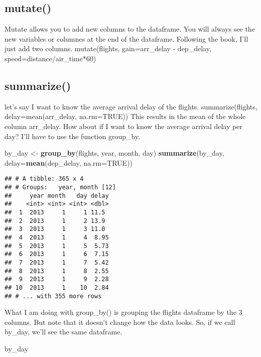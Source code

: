 \documentclass[
]{article}
\newenvironment{Shaded}{\begin{snugshade}}{\end{snugshade}}
\newcommand{\DataTypeTok}[1]{\textcolor[rgb]{0.13,0.29,0.53}{#1}}
\newcommand{\KeywordTok}[1]{\textcolor[rgb]{0.13,0.29,0.53}{\textbf{#1}}}
\newcommand{\NormalTok}[1]{#1}
\newcommand{\OtherTok}[1]{\textcolor[rgb]{0.56,0.35,0.01}{#1}}
\newcommand{\StringTok}[1]{\textcolor[rgb]{0.31,0.60,0.02}{#1}}
\begin{document}
\hypertarget{mutate}{%
\subsection{mutate()}\label{mutate}}

Mutate allows you to add new columns to the dataframe. You will always
see the new variables or columnes at the end of the dataframe. Following
the book, I'll just add two columns. mutate(flights, gain=arr\_delay -
dep\_delay, speed=distance/air\_time*60)

\hypertarget{summarize}{%
\subsection{summarize()}\label{summarize}}

let's say I want to know the average arrival delay of the flights.
summarize(flights, delay=mean(arr\_delay, na.rm=TRUE)) This results in
the mean of the whole column arr\_delay. How about if I want to know the
average arrival delay per day? I'll have to use the function group\_by.

\begin{Shaded}
\begin{Highlighting}[]
\NormalTok{by_day <-}\StringTok{ }\KeywordTok{group_by}\NormalTok{(flights, year, month, day)}
\KeywordTok{summarize}\NormalTok{(by_day, }\DataTypeTok{delay=}\KeywordTok{mean}\NormalTok{(dep_delay, }\DataTypeTok{na.rm=}\OtherTok{TRUE}\NormalTok{))}
\end{Highlighting}
\end{Shaded}

\begin{verbatim}
## # A tibble: 365 x 4
## # Groups:   year, month [12]
##     year month   day delay
##    <int> <int> <int> <dbl>
##  1  2013     1     1 11.5 
##  2  2013     1     2 13.9 
##  3  2013     1     3 11.0 
##  4  2013     1     4  8.95
##  5  2013     1     5  5.73
##  6  2013     1     6  7.15
##  7  2013     1     7  5.42
##  8  2013     1     8  2.55
##  9  2013     1     9  2.28
## 10  2013     1    10  2.84
## # ... with 355 more rows
\end{verbatim}

What I am doing with group\_by() is grouping the flights dataframe by
the 3 columns. But note that it doesn't change how the data looks. So,
if we call by\_day, we'll see the same dataframe.

\begin{Shaded}
\begin{Highlighting}[]
\NormalTok{by_day}
\end{Highlighting}
\end{Shaded}
\end{document}
